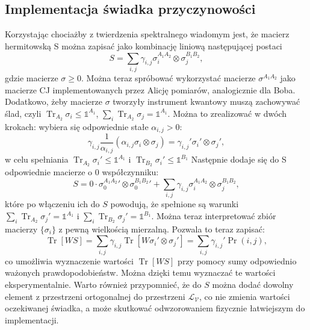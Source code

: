 \documentclass[10pt]{article} %
\DeclareMathOperator{\Trs}{Tr}
\newcommand{\I}{\mathbb{1}}
\begin{document}
\subsection{Implementacja świadka przyczynowości}
Korzystając chociażby z twierdzenia spektralnego wiadomym jest, że macierz hermitowską S można zapisać jako kombinację liniową następującej postaci
\begin{equation}
S = \sum_{i,j} \gamma_{i,j} \sigma^{A_1A_2}_i \otimes \sigma^{B_1B_2}_j,
\end{equation} gdzie macierze $\sigma \geq 0$. Można teraz spróbować wykorzystać macierze $\sigma^{A_1A_2}$ jako macierze CJ implementowanych przez Alicję pomiarów, analogicznie dla Boba. Dodatkowo, żeby macierze $\sigma$ tworzyły instrument kwantowy muszą zachowywać ślad, czyli $\Trs_{A_2} \sigma_i \leq \I^{A_1}$, $\sum_i \Trs_{A_2} \sigma_j = \I^{A_1}$. Można to zrealizować w dwóch krokach:
wybiera się odpowiednie stałe $\alpha_{i,j} > 0$:
\begin{equation}
\gamma_{i,j} \frac{1}{\alpha_{i,j}} (\alpha_{i,j} \sigma_{i} \otimes  \sigma_{j}) = \gamma_{i,j}' \sigma_i' \otimes \sigma_j',
\end{equation}
w celu spełniania $\Trs_{A_2} \sigma_i' \leq \I^{A_1}$ i $\Trs_{B_2} \sigma_i' \leq \I^{B_1}$
Następnie dodaje się do S odpowiednie macierze o 0 współczynniku:
\begin{equation}
S = 0 \cdot {\sigma_0^{A_1A_2}}' \otimes {\sigma_0^{B_1B_2}}' + \sum_{i,j} \gamma_{i,j} \sigma^{A_1A_2}_i \otimes \sigma^{B_1B_2}_j,
\end{equation} które po włączeniu ich do $S$ powodują, że spełnione są warunki $\sum_i \Trs_{A_2} \sigma_j' = \I^{A_1}$ i $\sum_i \Trs_{B_2} \sigma_j' = \I^{B_1}$.
Można teraz interpretować zbiór macierzy $\{ \sigma_i\}$ z pewną wielkością mierzalną. Pozwala to teraz zapisać:
\begin{equation}
\Trs \left[ W S \right] = \sum_{i,j} \gamma_{i,j} \Trs\left[ W \sigma_i' \otimes \sigma_j' \right] = \sum_{i,j} \gamma_{i,j}' \Pr(i,j),
\end{equation} co umożliwia wyznaczenie wartości $\Trs\left[ WS \right]$ przy pomocy sumy odpowiednio ważonych prawdopodobieństw. Można dzięki temu wyznaczać te wartości eksperymentalnie.
Warto również przypomnieć, że do $S$ można dodać dowolny element z przestrzeni ortogonalnej do przestrzeni $\mathcal{L_V}$, co nie zmienia wartości oczekiwanej świadka, a może skutkować odwzorowaniem fizycznie łatwiejszym do implementacji.
\end{document}
